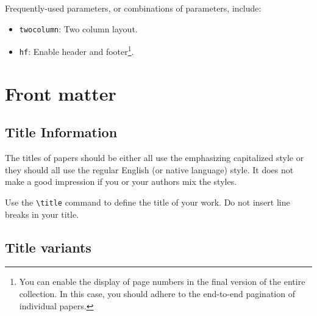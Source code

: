 \documentclass[
]{ceurart}
\begin{document}
Frequently-used parameters, or combinations of parameters, include:
\begin{itemize}
\item {\verb|twocolumn|}: Two column layout.
\item {\verb|hf|}: Enable header and footer\footnote{You can enable
    the display of page numbers in the final version of the entire
    collection. In this case, you should adhere to the end-to-end
    pagination of individual papers.}.
\end{itemize}

\section{Front matter}

\subsection{Title Information}

The titles of papers should be either all use the emphasizing
capitalized style or they should all use the regular English (or
native language) style. It does not make a good impression if you or
your authors mix the styles.

Use the \verb|\title| command to define the title of your work. Do not
insert line breaks in your title.

\subsection{Title variants}



\end{document}
